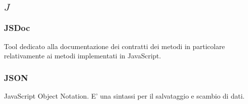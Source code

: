 \subsection*{\quad$J\quad$}
\subsubsection*{JSDoc}
Tool dedicato alla documentazione dei contratti dei metodi in particolare relativamente ai metodi implementati in JavaScript\glo.

\subsubsection*{JSON}
JavaScript Object Notation. E’ una sintassi per il salvataggio e scambio di dati.

